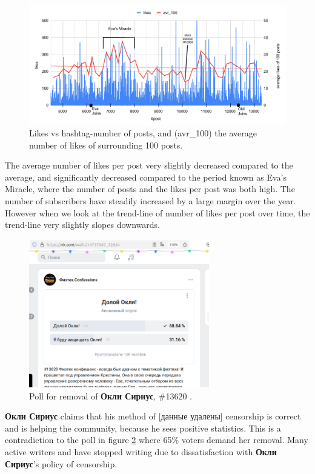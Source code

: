\documentclass[
	12pt
] {article}
\begin{document}
	\begin{figure}[H]
		\centering
		\includegraphics[width=1\textwidth]{fig-likes-vs-post-moving-average}
		\caption{Likes vs hashtag-number of posts, and (avr\_100) the average number of likes of surrounding 100 posts.}
		\label{fig-likes-vs-post-moving-average}
	\end{figure}
	
	The average number of likes per post very slightly decreased compared to the average, and significantly decreased compared to the period known as Eva's Miracle, where the number of posts and the likes per post was both high. The number of subscribers have steadily increased by a large margin over the year. However when we look at the trend-line of number of likes per post over time, the trend-line very slightly slopes downwards.
	
	\begin{figure}[H]
		\centering
		\includegraphics[width=0.7\textwidth]{fig-poll-for-okli-removal}
		\caption{Poll for removal of \textbf{Окли Сириус}, \#13620 \cite{vk-link-poll-removal-of-okli}.}
		\label{fig-poll-for-okli-removal}
	\end{figure}
	
	\textbf{Окли Сириус} claims that his method of [данные удалены] censorship is correct and is helping the community, because he sees positive statistics. This is a contradiction to the poll in figure \ref{fig-poll-for-okli-removal} where 65\% voters demand her removal. Many active writers and have stopped writing due to dissatisfaction with \textbf{Окли Сириус}'s policy of censorship.
		
\end{document}

